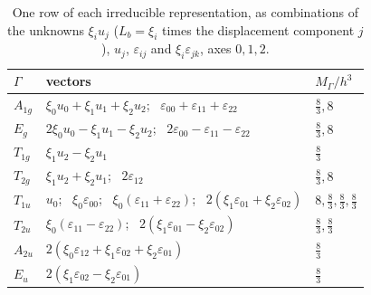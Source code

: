 \documentclass[11pt,a4paper]{article}
\begin{document}
\begin{table}[htbp]
\centering
\caption{One row of each irreducible representation, as combinations of the unknowns $\xi_iu_j$ ($L_b=\xi_i$
times the displacement component $j$), $u_j$, $\varepsilon_{ij}$ and $\xi_i\varepsilon_{jk}$, axes
$0,1,2$.}\label{tab:vectors}
\small
\begin{tabular}{@{}lll@{}}
\toprule
$\Gamma$ & vectors & $M_\Gamma/h^3$ \\
\midrule
$A_{1g}$ & $\xi_0u_0+\xi_1u_1+\xi_2u_2$; \ $\varepsilon_{00}+\varepsilon_{11}+\varepsilon_{22}$ & $\tfrac83,8$\\
$E_g$ & $2\xi_0u_0-\xi_1u_1-\xi_2u_2$; \ $2\varepsilon_{00}-\varepsilon_{11}-\varepsilon_{22}$ & $\tfrac83,8$\\
$T_{1g}$ & $\xi_1u_2-\xi_2u_1$ & $\tfrac83$\\
$T_{2g}$ & $\xi_1u_2+\xi_2u_1$; \ $2\varepsilon_{12}$ & $\tfrac83,8$\\
$T_{1u}$ & $u_0$; \ $\xi_0\varepsilon_{00}$; \ $\xi_0(\varepsilon_{11}+\varepsilon_{22})$; \
$2(\xi_1\varepsilon_{01}+\xi_2\varepsilon_{02})$ & $8,\tfrac83,\tfrac83,\tfrac83$\\
$T_{2u}$ & $\xi_0(\varepsilon_{11}-\varepsilon_{22})$; \ $2(\xi_1\varepsilon_{01}-\xi_2\varepsilon_{02})$ & $\tfrac83,\tfrac83$\\
$A_{2u}$ & $2(\xi_0\varepsilon_{12}+\xi_1\varepsilon_{02}+\xi_2\varepsilon_{01})$ & $\tfrac83$\\
$E_u$ & $2(\xi_1\varepsilon_{02}-\xi_2\varepsilon_{01})$ & $\tfrac83$\\
\bottomrule
\end{tabular}
\end{table}




\end{document}
